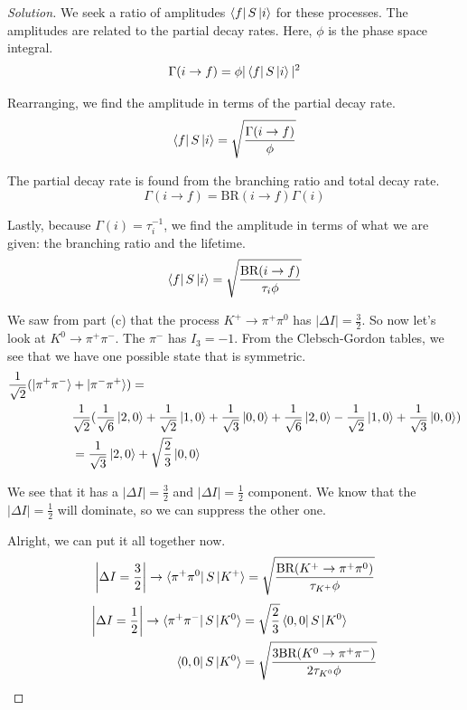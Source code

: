 \documentclass[12pt]{article}
\newenvironment{solution}{\begin{proof}[Solution]}{\end{proof}}
\begin{document}
\begin{solution}

We seek a ratio of amplitudes $\bra{f}S\ket{i}$ for these processes. The amplitudes are related to the partial decay rates. Here, $\phi$ is the phase space integral.
\begin{equation*}
    \Gamma(i\rightarrow f)=\phi |\bra{f}S\ket{i}|^2
\end{equation*}

Rearranging, we find the amplitude in terms of the partial decay rate.
\begin{equation*}
    \bra{f}S\ket{i}=\sqrt{\frac{\Gamma(i\rightarrow f)}{\phi}}
\end{equation*}

The partial decay rate is found from the branching ratio and total decay rate.
\begin{equation*}
    \Gamma(i\rightarrow f)=\text{BR}(i\rightarrow f) \Gamma(i)
\end{equation*}

Lastly, because $\Gamma(i)=\tau_i^{-1}$, we find the amplitude in terms of what we are given: the branching ratio and the lifetime.
\begin{equation*}
    \bra{f}S\ket{i}=\sqrt{\frac{\text{BR}(i\rightarrow f)}{\tau_i\phi}}
\end{equation*}

We saw from part (c) that the process $K^+\rightarrow\pi^+\pi^0$ has $|\Delta I|=\frac{3}{2}$. So now let's look at $K^0\rightarrow \pi^+ \pi^-$. The $\pi^-$ has $I_3=-1$. From the Clebsch-Gordon tables, we see that we have one possible state that is symmetric.
\begin{align*}
    \frac{1}{\sqrt{2}}(\ket{\pi^+\pi^-}&+\ket{\pi^-\pi^+})= \\
    &\frac{1}{\sqrt{2}}(\frac{1}{\sqrt{6}}\ket{2,0}+\frac{1}{\sqrt{2}}\ket{1,0}+\frac{1}{\sqrt{3}}\ket{0,0}+\frac{1}{\sqrt{6}}\ket{2,0}-\frac{1}{\sqrt{2}}\ket{1,0}+\frac{1}{\sqrt{3}}\ket{0,0}) \\
    &= \frac{1}{\sqrt{3}}\ket{2,0}+\sqrt{\frac{2}{3}}\ket{0,0}
\end{align*}

We see that it has a $|\Delta I|=\frac{3}{2}$ and $|\Delta I|=\frac{1}{2}$ component. We know that the $|\Delta I|=\frac{1}{2}$ will dominate, so we can suppress the other one.

Alright, we can put it all together now.
\begin{equation*}
    \left|\Delta I=\frac{3}{2}\right|\rightarrow \bra{\pi^+\pi^0}S\ket{K^+}=\sqrt{\frac{\text{BR}(K^+\rightarrow\pi^+\pi^0)}{\tau_{K^+}\phi}}
\end{equation*}
\begin{align*}
    \left|\Delta I=\frac{1}{2}\right|\rightarrow \bra{\pi^+\pi^-}S\ket{K^0}&=\sqrt{\frac{2}{3}}\bra{0,0}S\ket{K^0} \\ 
    \bra{0,0}S\ket{K^0} &= \sqrt{\frac{3\text{BR}(K^0\rightarrow\pi^+\pi^-)}{2\tau_{K^0}\phi}}
\end{align*}


\end{solution}
\end{document}

